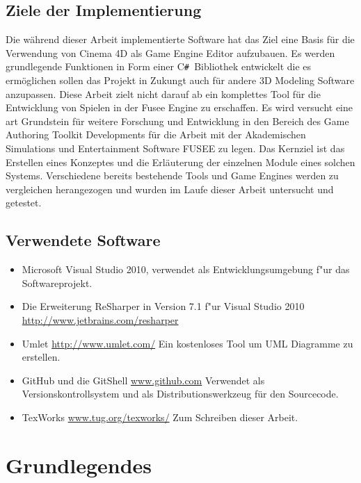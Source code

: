 \documentclass[pagesize, paper=a4, fontsize=12pt,titlepage=true, headings=small, headnosepline, abstractoff, liststotoc, nochapterprefix, plainheadsepline, twoside]{scrreprt}
\newcommand{\CSS}{C\texttt{\# }}
\begin{document}
\section{Ziele der Implementierung}
Die während dieser Arbeit implementierte Software hat das Ziel eine Basis für die Verwendung von Cinema 4D als Game Engine Editor aufzubauen. Es werden grundlegende Funktionen in Form einer \CSS Bibliothek entwickelt die es ermöglichen sollen das Projekt in Zukungt auch für andere 3D Modeling Software anzupassen. Diese Arbeit zielt nicht darauf ab ein komplettes Tool für die Entwicklung von Spielen in der Fusee Engine zu erschaffen. Es wird versucht eine art Grundstein für weitere Forschung und Entwicklung in den Bereich des Game Authoring Toolkit Developments für die Arbeit mit der Akademischen Simulations und Entertainment Software FUSEE zu legen. Das Kernziel ist das Erstellen eines Konzeptes und die Erläuterung der einzelnen Module eines solchen Systems. Verschiedene bereits bestehende Tools und Game Engines werden zu vergleichen herangezogen und wurden im Laufe dieser Arbeit untersucht und getestet.
\section{Verwendete Software}
\begin{itemize}
\item Microsoft Visual Studio 2010, \newline verwendet als Entwicklungsumgebung f"ur das Softwareprojekt.
\item Die Erweiterung ReSharper in Version 7.1 f"ur Visual Studio 2010 \url{http://www.jetbrains.com/resharper}
\item Umlet \url{http://www.umlet.com/} \newline Ein kostenloses Tool um UML Diagramme zu erstellen.
\item GitHub und die GitShell \url{www.github.com} \newline Verwendet als Versionskontrollsystem und als Distributionswerkzeug für den Sourcecode.
\item TexWorks \url{www.tug.org/texworks/} \newline Zum Schreiben dieser Arbeit.
\end{itemize}

\chapter{Grundlegendes}
\end{document}
